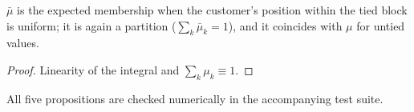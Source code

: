 \begin{proposition}\label{prop:ties}
$\bar\mu$ is the expected membership when the customer's position within the tied block is uniform; it is again a partition ($\sum_k \bar\mu_k = 1$), and it coincides with $\mu$ for untied values.
\end{proposition}
\begin{proof}
Linearity of the integral and $\sum_k \mu_k \equiv 1$.
\end{proof}

All five propositions are checked numerically in the accompanying test suite.
